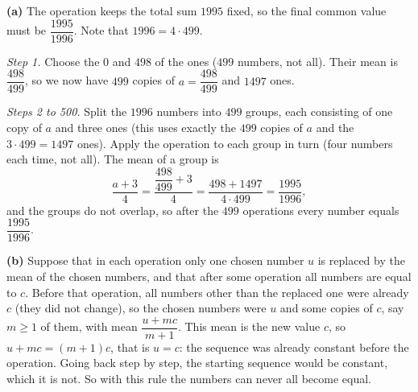 \textbf{(a)} The operation keeps the total sum $1995$ fixed, so the final common value must be $\dfrac{1995}{1996}$. Note that $1996=4\cdot499$.

\emph{Step 1.} Choose the $0$ and $498$ of the ones ($499$ numbers, not all). Their mean is $\dfrac{498}{499}$, so we now have $499$ copies of $a=\dfrac{498}{499}$ and $1497$ ones.

\emph{Steps 2 to 500.} Split the $1996$ numbers into $499$ groups, each consisting of one copy of $a$ and three ones (this uses exactly the $499$ copies of $a$ and the $3\cdot499=1497$ ones). Apply the operation to each group in turn (four numbers each time, not all). The mean of a group is
\[
\dfrac{a+3}{4}=\dfrac{\dfrac{498}{499}+3}{4}=\dfrac{498+1497}{4\cdot499}=\dfrac{1995}{1996},
\]
and the groups do not overlap, so after the $499$ operations every number equals $\dfrac{1995}{1996}$.

\textbf{(b)} Suppose that in each operation only one chosen number $u$ is replaced by the mean of the chosen numbers, and that after some operation all numbers are equal to $c$. Before that operation, all numbers other than the replaced one were already $c$ (they did not change), so the chosen numbers were $u$ and some copies of $c$, say $m\ge1$ of them, with mean $\dfrac{u+mc}{m+1}$. This mean is the new value $c$, so $u+mc=(m+1)c$, that is $u=c$: the sequence was already constant before the operation. Going back step by step, the starting sequence would be constant, which it is not. So with this rule the numbers can never all become equal.
